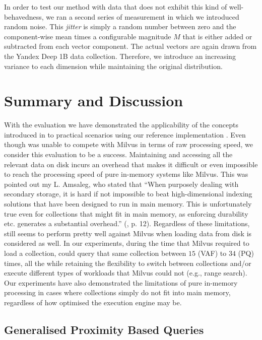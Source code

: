 In order to test our method with data that does not exhibit this kind of well-behavedness, we ran a second series of measurement in which we introduced random noise. This \emph{jitter} is simply a random number between zero and the component-wise mean times a configurable magnitude $M$ that is either added or subtracted from each vector component. The actual vectors are again drawn from the Yandex Deep 1B data collection. Therefore, we introduce an increasing variance to each dimension while maintaining the original distribution.

\newpage
 
\section{Summary and Discussion}
\label{section:discussion}

With the evaluation we have demonstrated the applicability of the concepts introduced in  to practical scenarios using our reference implementation \cottontail{}. Even though \cottontail{} was unable to compete with Milvus in terms of raw processing speed, we consider this evaluation to be a success. Maintaining and accessing all the relevant data on disk incurs an overhead that makes it difficult or even impossible to reach the processing speed of pure in-memory systems like Milvus. This was pointed out my L. Amsaleg, who stated that ``When purposely dealing with secondary storage, it is hard if not impossible to beat high-dimensional indexing solutions that have been designed to run in main memory. This is unfortunately true even for collections that might fit in main memory, as enforcing durability etc. generates a substantial overhead.'' (\cite{Amsaleg:2014Database}, p. 12). Regardless of these limitations, \cottontail{} still seems to perform pretty well against Milvus when loading data from disk is considered as well. In our experiments, during the time that Milvus required to load a collection, \cottontail{} could query that same collection between $15$ (VAF) to $34$ (PQ) times, all the while retaining the flexibility to switch between collections and/or execute different types of workloads that Milvus could not (e.g., range search). Our experiments have also demonstrated the limitations of pure in-memory processing in cases where collections simply do not fit into main memory, regardless of how optimised the execution engine may be.

\subsection{Generalised Proximity Based Queries}

